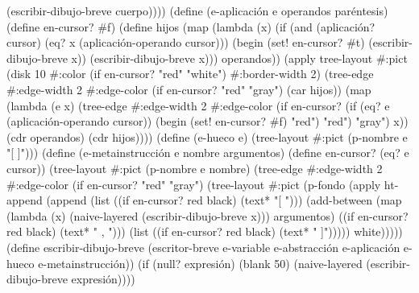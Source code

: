 \documentclass[10pt,oneside,openany,letterpaper]{book}
\begin{document}
                            (escribir-dibujo-breve cuerpo))))
  (define (e-aplicación e operandos paréntesis)
    (define en-cursor? #f)
    (define hijos (map (lambda (x)
                         (if (and (aplicación? cursor) (eq? x (aplicación-operando cursor)))
                             (begin
                               (set! en-cursor? #t)
                               (escribir-dibujo-breve x))
                             (escribir-dibujo-breve x)))
                       operandos))
    (apply tree-layout #:pict (disk 10
                                    #:color (if en-cursor? "red" "white")
                                    #:border-width 2)
           (tree-edge #:edge-width 2
                      #:edge-color (if en-cursor? "red" "gray")
                      (car hijos))
           (map (lambda (e x)
                  (tree-edge #:edge-width 2
                             #:edge-color (if en-cursor?
                                              (if (eq? e (aplicación-operando cursor))
                                                  (begin
                                                    (set! en-cursor? #f)
                                                    "red")
                                                  "red")
                                              "gray")
                             x))
                (cdr operandos)
                (cdr hijos))))
  (define (e-hueco e)
    (tree-layout #:pict (p-nombre e "[ ]")))
  (define (e-metainstrucción e nombre argumentos)
    (define en-cursor? (eq? e cursor))
    (tree-layout
     #:pict (p-nombre e nombre)
     (tree-edge #:edge-width 2
                #:edge-color (if en-cursor? "red" "gray")
                (tree-layout #:pict
                             (p-fondo
                              (apply ht-append
                                     (append (list ((if en-cursor? red black) (text* "[ ")))
                                             (add-between
                                              (map (lambda (x)
                                                     (naive-layered (escribir-dibujo-breve x)))
                                                   argumentos)
                                              ((if en-cursor? red black) (text* " , ")))
                                             (list ((if en-cursor? red black) (text* " ]")))))
                              white)))))
  (define escribir-dibujo-breve
    (escritor-breve e-variable e-abstracción e-aplicación
                    e-hueco e-metainstrucción))
  (if (null? expresión)
      (blank 50)
      (naive-layered (escribir-dibujo-breve expresión))))
\end{document}
